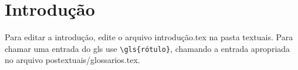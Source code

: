 \chapter{Introdução}
Para editar a introdução, edite o arquivo introdução.tex na pasta textuais. Para chamar uma entrada do \gls{gls} use \verb+\gls{rótulo}+, chamando a entrada apropriada no arquivo postextuais/glossarios.tex.